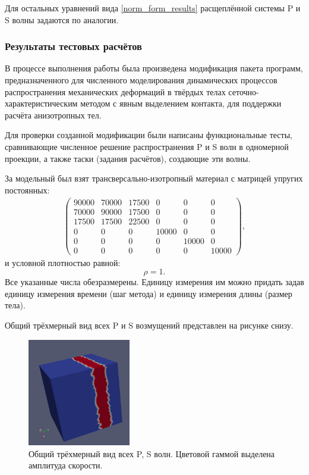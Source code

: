 	Для остальных уравнений вида \eqref{norm_form_results} расщеплённой системы P и S волны задаются по аналогии.
	
\subsubsection{Результаты тестовых расчётов}

	В процессе выполнения работы была произведена модификация пакета программ, предназначенного для численного моделирования динамических процессов распространения механических деформаций в твёрдых телах сеточно-характеристическим методом с явным выделением контакта, для поддержки расчёта анизотропных тел.

	Для проверки созданной модификации были написаны функциональные тесты, сравнивающие численное решение распространения P и S волн в одномерной проекции, а также таски (задания расчётов), создающие эти волны.
	
	За модельный был взят трансверсально-изотропный материал с матрицей упругих постоянных:
\begin{align}
\label{veryfication_mat}
\left( \begin{array}{cccccccccccc}
90000 & 70000 & 17500 & 0 & 0 & 0 \\ 
70000 & 90000 & 17500 & 0 & 0 & 0 \\ 
17500 & 17500 & 22500 & 0 & 0 & 0 \\ 
0 & 0 & 0 & 10000 & 0 & 0 \\ 
0 & 0 & 0 & 0 & 10000 & 0 \\ 
0 & 0 & 0 & 0 & 0 & 10000
\end{array} \right),
\end{align}	
	и условной плотностью равной:
\begin{equation}
	\rho = 1.
\end{equation}
	Все указанные числа обезразмерены.
	Единицу измерения им можно придать задав единицу измерения времени (шаг метода) и единицу измерения длины (размер тела).

	Общий трёхмерный вид всех P и S возмущений представлен на рисунке снизу.
\begin{figure}[H]
\centerline{\includegraphics[width=0.4\textwidth]{png/veryfication/p-wave-view.png}}
\caption{Общий трёхмерный вид всех P, S волн. Цветовой гаммой выделена амплитуда скорости.}
\label{pic:p-wave-view}
\end{figure}
	
